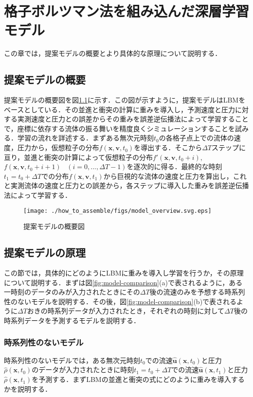 \chapter{格子ボルツマン法を組み込んだ深層学習モデル\label{chap:how-to-assemble}}
この章では，提案モデルの概要とより具体的な原理について説明する．

\section{提案モデルの概要}
提案モデルの概要図を図\ref{fig:overview}に示す．この図が示すように，提案モデルはLBMをベースとしている．その並進と衝突の計算に重みを導入し，予測速度と圧力に対する実測速度と圧力との誤差からその重みを誤差逆伝播法によって学習することで，座標に依存する流体の振る舞いを精度良くシミュレーションすることを試みる．学習の流れを詳述する．まずある無次元時刻$t_0$の各格子点上での流体の速度，圧力から，仮想粒子の分布$f(\bm{x}, \bm{v}, t_0)$を導出する．そこから$\Delta T$ステップに亘り，並進と衝突の計算によって仮想粒子の分布$f'(\bm{x}, \bm{v}, t_0+i)$, $f(\bm{x}, \bm{v}, t_0+i+1) \hspace{10pt}(i=0,...,\Delta T - 1)$を逐次的に得る．最終的な時刻$t_1 = t_0 + \Delta T$での分布$f(\bm{x}, \bm{v}, t_1)$から巨視的な流体の速度と圧力を算出し，これと実測流体の速度と圧力との誤差から，各ステップに導入した重みを誤差逆伝播法によって学習する．
\begin{figure}[bp]
  \centering
  \texttt{[image: ./how\_to\_assemble/figs/model\_overview.svg.eps]}
  \caption{提案モデルの概要図}
  \label{fig:overview}
\end{figure}

\section{提案モデルの原理}
この節では，具体的にどのようにLBMに重みを導入し学習を行うか，その原理について説明する．まずは図\ref{fig:model-comparison}(a)で表されるように，ある一時刻のデータのみが入力されたときにその$\Delta T$後の流速のみを予想する時系列性のないモデルを説明する．その後，図\ref{fig:model-comparison}(b)で表されるように$\Delta T$おきの時系列データが入力されたとき，それぞれの時刻に対して$\Delta T$後の時系列データを予測するモデルを説明する．

\subsection{時系列性のないモデル\label{subsection:time-series-less-model}}
時系列性のないモデルでは，ある無次元時刻$t_0$での流速$\hat{\bm{u}}(\bm{x}, t_0)$と圧力$\hat{\rho}(\bm{x}, t_0)$のデータが入力されたときに時刻$t_1 = t_0 + \Delta T$での流速$\hat{\bm{u}}(\bm{x}, t_1)$と圧力$\hat{\rho}(\bm{x}, t_1)$を予測する．まずLBMの並進と衝突の式にどのように重みを導入するかを説明する．

